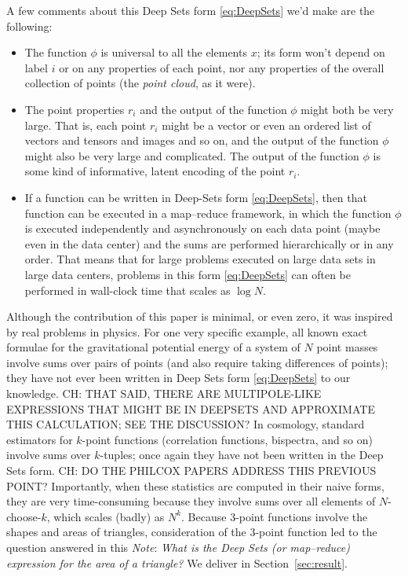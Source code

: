 \documentclass[12pt]{article}
\newcommand{\documentname}{\textsl{Note}}
\newcommand{\sectionname}{Section}
\newcommand{\secref}[1]{\sectionname~\ref{#1}}
\begin{document}
A few comments about this Deep Sets form \eqref{eq:DeepSets} we'd make are the following:
\begin{itemize}
    \item The function $\phi$ is universal to all the elements $x$; its form won't depend on label $i$ or on any properties of each point, nor any properties of the overall collection of points (the \emph{point cloud}, as it were).
    \item The point properties $r_i$ and the output of the function $\phi$ might both be very large.
    That is, each point $r_i$ might be a vector or even an ordered list of vectors and tensors and images and so on, and the output of the function $\phi$ might also be very large and complicated.
    The output of the function $\phi$ is some kind of informative, latent encoding of the point $r_i$.
    \item If a function can be written in Deep-Sets form \eqref{eq:DeepSets}, then that function can be executed in a map--reduce framework, in which the function $\phi$ is executed independently and asynchronously on each data point (maybe even in the data center) and the sums are performed hierarchically or in any order.
    That means that for large problems executed on large data sets in large data centers, problems in this form \eqref{eq:DeepSets} can often be performed in wall-clock time that scales as $\log N$.
\end{itemize}

Although the contribution of this paper is minimal, or even zero, it was inspired by real problems in physics.
For one very specific example, all known exact formulae for the gravitational potential energy of a system of $N$ point masses involve sums over pairs of points (and also require taking differences of points); they have not ever been written in Deep Sets form \eqref{eq:DeepSets} to our knowledge.
CH: THAT SAID, THERE ARE MULTIPOLE-LIKE EXPRESSIONS THAT MIGHT BE IN DEEPSETS AND APPROXIMATE THIS CALCULATION; SEE THE DISCUSSION?
In cosmology, standard estimators for $k$-point functions (correlation functions, bispectra, and so on) involve sums over $k$-tuples; once again they have not been written in the Deep Sets form.
CH: DO THE PHILCOX PAPERS ADDRESS THIS PREVIOUS POINT?
Importantly, when these statistics are computed in their naive forms, they are very time-consuming because they involve sums over all elements of $N$-choose-$k$, which scales (badly) as $N^k$.
Because 3-point functions involve the shapes and areas of triangles, consideration of the 3-point function led to the question answered in this \documentname:
\emph{What is the Deep Sets (or map--reduce) expression for the area of a triangle?}
We deliver in \secref{sec:result}.
\end{document}

